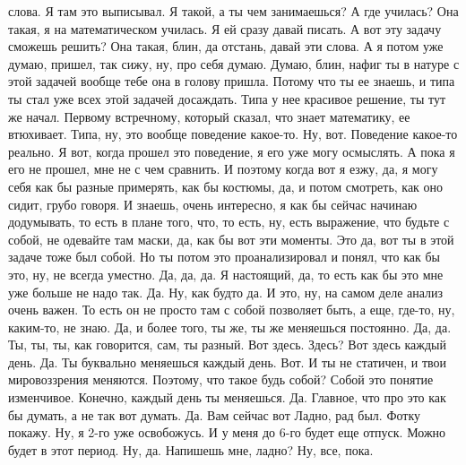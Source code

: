 слова.
Я там это выписывал.
Я такой, а ты чем занимаешься?
А где училась?
Она такая, я на математическом училась.
Я ей сразу давай писать.
А вот эту задачу сможешь решить?
Она такая, блин, да отстань, давай эти слова.
А я потом уже думаю, пришел, так
сижу, ну, про себя думаю.
Думаю, блин, нафиг ты
в натуре с этой задачей вообще
тебе она в голову пришла. Потому что ты
ее знаешь, и типа ты стал уже
всех этой задачей досаждать.
Типа у нее красивое решение, ты тут же начал.
Первому встречному, который сказал, что
знает математику, ее втюхивает.
Типа, ну, это вообще поведение
какое-то.
Ну, вот.
Поведение какое-то реально.
Я вот, когда прошел это поведение,
я его уже могу осмыслять.
А пока я его не прошел,
мне не с чем сравнить. И поэтому
когда вот я езжу, да,
я могу себя как бы
разные примерять, как бы костюмы, да,
и потом смотреть, как оно сидит,
грубо говоря.
И знаешь, очень интересно,
я как бы сейчас начинаю додумывать, то есть
в плане того, что, то есть, ну,
есть выражение, что будьте с собой, не одевайте
там маски, да, как бы вот эти моменты.
Это да, вот ты в этой задаче тоже
был собой. Но ты потом
это проанализировал и понял, что как бы
это, ну, не всегда уместно.
Да, да, да. Я настоящий,
да, то есть как бы это мне уже больше не надо
так. Да. Ну, как будто да.
И это, ну, на самом деле анализ
очень важен. То есть он не просто там с собой
позволяет быть, а еще,
где-то, ну, каким-то,
не знаю. Да, и более того, ты же, ты же
меняешься постоянно. Да, да.
Ты, ты, ты, как говорится, сам,
ты разный. Вот здесь. Здесь?
Вот здесь каждый день. Да. Ты буквально
меняешься каждый день. Вот.
И ты не статичен, и твои мировоззрения
меняются. Поэтому, что такое
будь собой? Собой это понятие
изменчивое. Конечно, каждый день ты
меняешься. Да. Главное, что про это как бы
думать, а не так вот думать.
Да.
Вам сейчас вот
Ладно, рад был.
Фотку покажу.
Ну, я
2-го уже освобожусь.
И у меня до 6-го будет еще отпуск.
Можно будет в этот период.
Ну, да. Напишешь мне, ладно?
Ну, все, пока.
